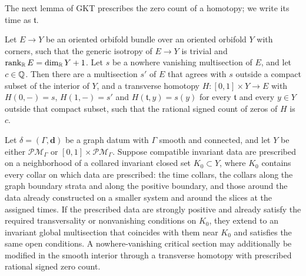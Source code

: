 The next lemma of GKT prescribes the zero count of a homotopy; we write its
time as $\mathfrak t$.

\begin{importedthm}
Let $E\to Y$ be an oriented orbifold bundle over an oriented orbifold $Y$
with corners, such that the generic isotropy of $E\to Y$ is trivial and
$\operatorname{rank}_\mathbb R E=\dim_\mathbb R Y+1$.  Let $s$ be a nowhere vanishing
multisection of $E$, and let $c\in\mathbb Q$.  Then there are a multisection $s'$
of $E$ that agrees with $s$ outside a compact subset of the interior of $Y$,
and a transverse homotopy $H:[0,1]\times Y\to E$ with $H(0,-)=s$,
$H(1,-)=s'$ and $H(\mathfrak t,y)=s(y)$ for every $\mathfrak t$ and every
$y\in Y$ outside that compact subset, such that the rational signed count of zeros of
$H$ is $c$.
\end{importedthm}

\begin{lemma}
\label{lem:relative-multisection}
Let $\delta=(\Gamma,\mathbf d)$ be a graph datum with $\Gamma$ smooth and
connected, and let $Y$ be either
$\mathcal{PM}_\Gamma$ or $[0,1]\times\mathcal{PM}_\Gamma$.  Suppose
compatible invariant data are prescribed on a neighborhood of a collared
invariant closed set $K_0\subset Y$, where $K_0$ contains every collar on
which data are prescribed: the time collars, the collars along the graph
boundary strata and along the positive boundary, and those around the data
already constructed on a smaller system and around the slices at the
assigned times.  If the prescribed data are strongly positive and already
satisfy the required transversality or nonvanishing conditions on $K_0$,
they extend to an invariant global multisection that coincides with them
near $K_0$ and satisfies the same open conditions.  A nowhere-vanishing critical section may additionally be
modified in the smooth interior through a transverse homotopy with
prescribed rational signed zero count.
\end{lemma}

